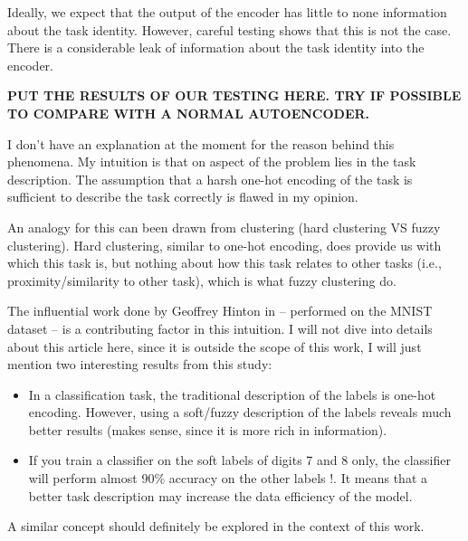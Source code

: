 Ideally, we expect that the output of the encoder has little to none information about the task identity. However, careful testing shows that this is not the case. There is a considerable leak of information about the task identity into the encoder.

\textbf{PUT THE RESULTS OF OUR TESTING HERE. TRY IF POSSIBLE TO COMPARE WITH A NORMAL AUTOENCODER.}

I don't have an explanation at the moment for the reason behind this phenomena. My intuition is that on aspect of the problem lies in the task description. The assumption that a harsh one-hot encoding of the task is sufficient to describe the task correctly is flawed in my opinion.

An analogy for this can been drawn from clustering (hard clustering VS fuzzy clustering). Hard clustering, similar to one-hot encoding, does provide us with which this task is, but nothing about how this task relates to other tasks (i.e., proximity/similarity to other task), which is what fuzzy clustering do.

The influential work done by Geoffrey Hinton in \cite{hinton2015distilling} -- performed on the MNIST dataset \cite{lecun-mnisthandwrittendigit-2010} -- is a contributing factor in this intuition. I will not dive into details about this article here, since it is outside the scope of this work, I will just mention two interesting results from this study:
\begin{itemize}[noitemsep]
    \item In a classification task, the traditional description of the labels is one-hot encoding. However, using a soft/fuzzy description of the labels reveals much better results (makes sense, since it is more rich in information).
    \item If you train a classifier on the soft labels of digits 7 and 8 only, the classifier will perform almost 90\% accuracy on the other labels !. It means that a better task description may increase the data efficiency of the model.
\end{itemize}
A similar concept should definitely be explored in the context of this work.

